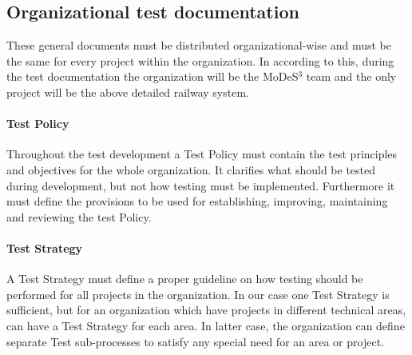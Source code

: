 \subsection{Organizational test documentation}
These general documents must be distributed organizational-wise and must be the same for every project within the organization. In according to this, during the test documentation the organization will be the MoDeS$^3$ team and the only project will be the above detailed railway system.

\paragraph{Test Policy}
Throughout the test development a Test Policy must contain the test principles and objectives for the whole organization. It clarifies what should be tested during development, but not how testing must be implemented. Furthermore it must define the provisions to be used for establishing, improving, maintaining and reviewing the test Policy.

\paragraph{Test Strategy}
A Test Strategy must define a proper guideline on how testing should be performed for all projects in the organization. In our case one Test Strategy is sufficient, but for an organization which have projects in different technical areas, can have a Test Strategy for each area. In latter case, the organization can define separate Test sub-processes to satisfy any special need for an area or project.


